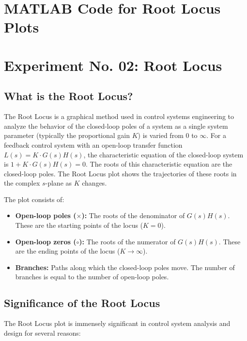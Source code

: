 \documentclass[a4paper,12pt]{article}
\begin{document}
	\section*{MATLAB Code for Root Locus Plots}
	

\section*{Experiment No. 02: Root Locus}

\subsection*{What is the Root Locus?}

The Root Locus is a graphical method used in control systems engineering to analyze the behavior of the closed-loop poles of a system as a single system parameter (typically the proportional gain $K$) is varied from $0$ to $\infty$. For a feedback control system with an open-loop transfer function $L(s) = K \cdot G(s)H(s)$, the characteristic equation of the closed-loop system is $1 + K \cdot G(s)H(s) = 0$. The roots of this characteristic equation are the closed-loop poles. The Root Locus plot shows the trajectories of these roots in the complex $s$-plane as $K$ changes.

The plot consists of:
\begin{itemize}
	\item \textbf{Open-loop poles ($\times$):} The roots of the denominator of $G(s)H(s)$. These are the starting points of the locus ($K=0$).
	\item \textbf{Open-loop zeros ($\circ$):} The roots of the numerator of $G(s)H(s)$. These are the ending points of the locus ($K \to \infty$).
	\item \textbf{Branches:} Paths along which the closed-loop poles move. The number of branches is equal to the number of open-loop poles.
\end{itemize}

\subsection*{Significance of the Root Locus}

The Root Locus plot is immensely significant in control system analysis and design for several reasons:
\end{document}
